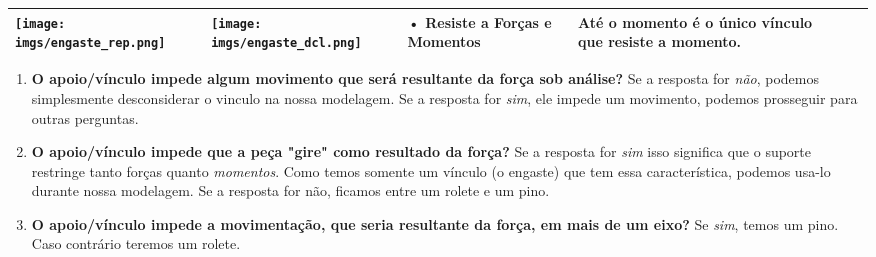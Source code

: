 \documentclass{article}
\begin{document}
\begin{table}[h]
\begin{tabularx}{\textwidth}{|l|X|X|X|l|l|}
                                \begin{minipage}{.2\columnwidth}
                                    \centering
                                    \texttt{[image: imgs/engaste\_rep.png]}
                                \end{minipage} &
    
                                \begin{minipage}{.2\columnwidth}
                                    \centering
                                    \texttt{[image: imgs/engaste\_dcl.png]}
                                \end{minipage} &
    
                                \begin{minipage}{.1\columnwidth}
                                    \tiny
                                    • Resiste a \textbf{Forças} e \textbf{Momentos}
                                \end{minipage}&
    
                                \begin{minipage}{.1\columnwidth}
                                    \vspace{5px}
                                    \tiny
                                    Até o momento é o único vínculo que resiste a momento.
                                    \vspace{5px}
                                \end{minipage} \\ \hline
    
                    \end{tabularx}
                \end{table}

                \begin{minipage}{.9\textwidth}\tiny
                    \begin{enumerate}
                        \item \textbf{O apoio/vínculo impede algum movimento que será resultante da força sob análise?} Se a resposta for \emph{não}, podemos simplesmente desconsiderar o vinculo na nossa
                        modelagem. Se a resposta for \emph{sim}, ele impede um movimento, podemos prosseguir para outras perguntas.
                        \item \textbf{O apoio/vínculo impede que a peça "gire" como resultado da força?} Se a resposta for \emph{sim} isso significa que o suporte restringe tanto forças quanto
                        \emph{momentos}. Como temos somente um vínculo (o engaste) que tem essa característica, podemos usa-lo durante nossa modelagem. Se a resposta for não, ficamos entre um rolete e um pino.
                        \item \textbf{O apoio/vínculo impede a movimentação, que seria resultante da força, em mais de um eixo?} Se \emph{sim}, temos um pino. Caso contrário teremos um rolete.
                    \end{enumerate}
                \end{minipage}
\end{document}
